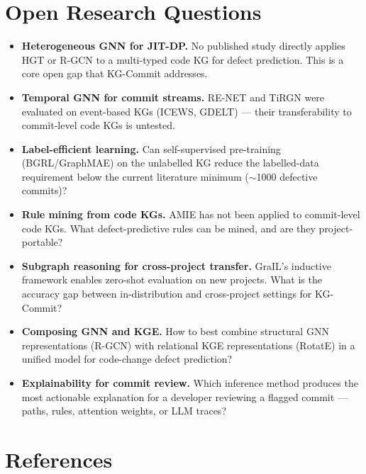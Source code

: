 \documentclass[12pt,a4paper]{article}
\begin{document}
\section{Open Research Questions}

\begin{itemize}[leftmargin=1.5em]
  \item \textbf{Heterogeneous GNN for JIT-DP.} No published study directly
        applies HGT or R-GCN to a multi-typed code KG for defect prediction.
        This is a core open gap that KG-Commit addresses.
  \item \textbf{Temporal GNN for commit streams.} RE-NET and TiRGN were
        evaluated on event-based KGs (ICEWS, GDELT) --- their transferability
        to commit-level code KGs is untested.
  \item \textbf{Label-efficient learning.} Can self-supervised pre-training
        (BGRL/GraphMAE) on the unlabelled KG reduce the labelled-data
        requirement below the current literature minimum ($\sim$1000 defective
        commits)?
  \item \textbf{Rule mining from code KGs.} AMIE has not been applied to
        commit-level code KGs. What defect-predictive rules can be mined, and
        are they project-portable?
  \item \textbf{Subgraph reasoning for cross-project transfer.} GraIL's
        inductive framework enables zero-shot evaluation on new projects. What
        is the accuracy gap between in-distribution and cross-project settings
        for KG-Commit?
  \item \textbf{Composing GNN and KGE.} How to best combine structural GNN
        representations (R-GCN) with relational KGE representations (RotatE)
        in a unified model for code-change defect prediction?
  \item \textbf{Explainability for commit review.} Which inference method
        produces the most actionable explanation for a developer reviewing a
        flagged commit --- paths, rules, attention weights, or LLM traces?
\end{itemize}

\section*{References}
\end{document}
